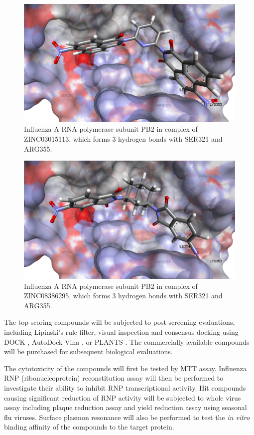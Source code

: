 \begin{figure}
\centering
\includegraphics[width=\linewidth]{Case/2VQZ-ZINC03015113.png}
\caption{Influenza A RNA polymerase subunit PB2 in complex of ZINC03015113, which forms 3 hydrogen bonds with SER321 and ARG355.}
\label{Case:2VQZ-ZINC03015113}
\end{figure}

\begin{figure}
\centering
\includegraphics[width=\linewidth]{Case/2VQZ-ZINC08386295.png}
\caption{Influenza A RNA polymerase subunit PB2 in complex of ZINC08386295, which forms 3 hydrogen bonds with SER321 and ARG355.}
\label{Case:2VQZ-ZINC08386295}
\end{figure}

The top scoring compounds will be subjected to post-screening evaluations, including Lipinski’s rule filter, visual inspection and consensus docking using DOCK \citep{1222}, AutoDock Vina \citep{595}, or PLANTS \citep{610,607,779}. The commercially available compounds will be purchased for subsequent biological evaluations.

The cytotoxicity of the compounds will first be tested by MTT assay. Influenza RNP (ribonucleoprotein) reconstitution assay will then be performed to investigate their ability to inhibit RNP transcriptional activity. Hit compounds causing significant reduction of RNP activity will be subjected to whole virus assay including plaque reduction assay and yield reduction assay using seasonal flu viruses. Surface plasmon resonance will also be performed to test the \textit{in vitro} binding affinity of the compounds to the target protein. 

